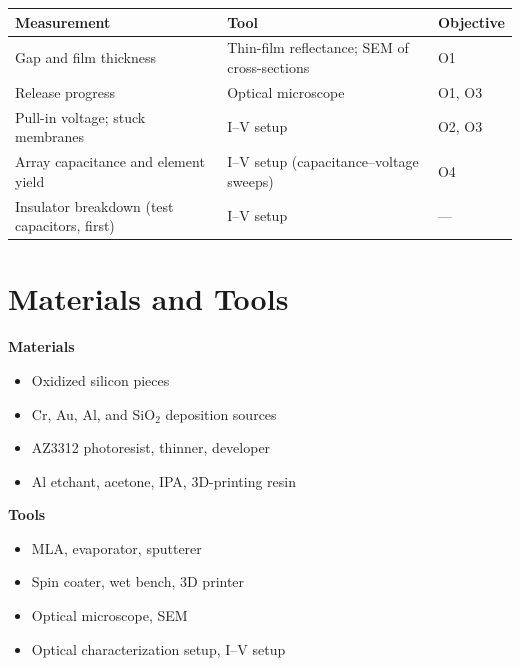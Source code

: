\documentclass[11pt]{article}
\begin{document}
\begin{center}
  \vspace{-2pt}
  \small\setlength{\tabcolsep}{8pt}
  \begin{tabularx}{\textwidth}{@{}L P{6.4cm} P{2cm}@{}}
    \toprule
    \textbf{Measurement} & \textbf{Tool} & \textbf{Objective} \\
    \midrule
    Gap and film thickness                        & Thin-film reflectance; SEM of cross-sections & O1 \\
    Release progress                              & Optical microscope                           & O1, O3 \\
    Pull-in voltage; stuck membranes              & I--V setup                                   & O2, O3 \\
    Array capacitance and element yield           & I--V setup (capacitance--voltage sweeps)     & O4 \\
    Insulator breakdown (test capacitors, first)  & I--V setup                                   & --- \\
    \bottomrule
  \end{tabularx}
  \vspace{-8pt}
\end{center}

\section{Materials and Tools}

\noindent
\begin{minipage}[t]{0.48\textwidth}
  \textbf{Materials}
  \begin{itemize}[leftmargin=1.6em]
    \item Oxidized silicon pieces
    \item Cr, Au, Al, and SiO$_2$ deposition sources
    \item AZ3312 photoresist, thinner, developer
    \item Al etchant, acetone, IPA, 3D-printing resin
  \end{itemize}
\end{minipage}\hfill
\begin{minipage}[t]{0.48\textwidth}
  \textbf{Tools}
  \begin{itemize}[leftmargin=1.6em]
    \item MLA, evaporator, sputterer
    \item Spin coater, wet bench, 3D printer
    \item Optical microscope, SEM
    \item Optical characterization setup, I--V setup
  \end{itemize}
\end{minipage}
\end{document}
